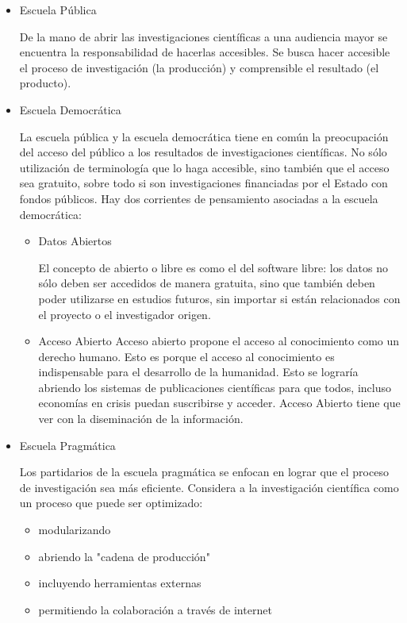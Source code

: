 \begin{itemize}
\item {Escuela Pública}
\begin{description}
De la mano de abrir las investigaciones científicas a una audiencia mayor se encuentra la responsabilidad de hacerlas accesibles. Se busca hacer accesible el proceso de investigación (la producción) y comprensible el resultado (el producto).
\end{description}

\item {Escuela Democrática}
\begin{description}
La escuela pública y la escuela democrática tiene en común la preocupación del acceso del público a los resultados de investigaciones científicas. No sólo utilización de terminología que lo haga accesible, sino también que el acceso sea gratuito, sobre todo si son investigaciones financiadas por el Estado con fondos públicos.
Hay dos corrientes de pensamiento asociadas a la escuela democrática:
\begin{itemize}
\item{Datos Abiertos}
\begin{description}
El concepto de abierto o libre es como el del software libre: los datos no sólo deben ser accedidos de manera gratuita, sino que también deben poder utilizarse en estudios futuros, sin importar si están relacionados con el proyecto o el investigador origen.
\end{description}
\item{Acceso Abierto}
Acceso abierto propone el acceso al conocimiento como un derecho humano. Esto es porque el acceso al conocimiento es indispensable para el desarrollo de la humanidad. Esto se lograría abriendo los sistemas de publicaciones científicas para que todos, incluso economías en crisis puedan suscribirse y acceder. Acceso Abierto tiene que ver con la diseminación de la información.
\end{itemize}
\end{description}
\item {Escuela Pragmática}
\begin{description}
Los partidarios de la escuela pragmática se enfocan en lograr que el proceso de investigación sea más eficiente. Considera a la investigación científica como un proceso que puede ser optimizado:
\begin{itemize}
\item modularizando
\item abriendo la "cadena de producción"
\item incluyendo herramientas externas
\item permitiendo la colaboración a través de internet
\end{itemize}
\end{description}
\end{itemize}



